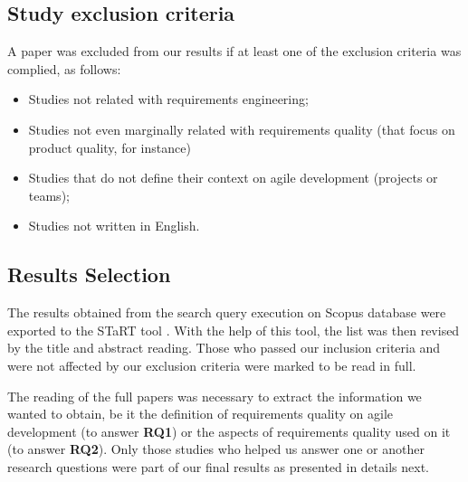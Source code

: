 \subsection{Study exclusion criteria}

A paper was excluded from our results if at least one of the exclusion criteria was complied, as follows:

\begin{itemize}[noitemsep,nolistsep]
    \item Studies not related with requirements engineering;
    \item Studies not even marginally related with requirements quality (that focus on product quality, for instance)
    \item Studies that do not define their context on agile development (projects or teams);
    \item Studies not written in English.
\end{itemize}

\subsection{Results Selection}

The results obtained from the search query execution on Scopus database were exported to the STaRT tool \cite{Start_2012}. With the help of this tool, the list was then revised by the title and abstract reading. Those who passed our inclusion criteria and were not affected by our exclusion criteria were marked to be read in full. 

The reading of the full papers was necessary to extract the information we wanted to obtain, be it the definition of requirements quality on agile development (to answer \textbf{RQ1}) or the aspects of requirements quality used on it (to answer \textbf{RQ2}). Only those studies who helped us answer one or another research questions were part of our final results as presented in details next.